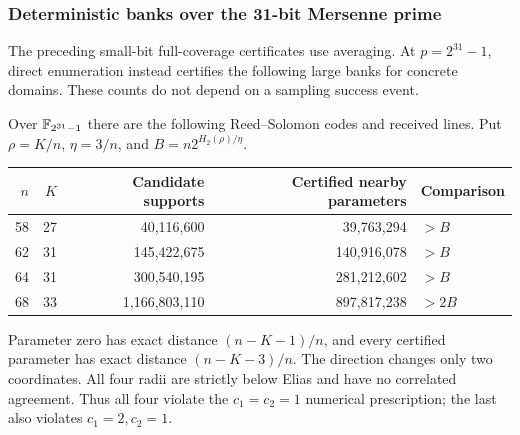\subsubsection{Deterministic banks over the 31-bit Mersenne prime}
\label{sec:paired-m31}

The preceding small-bit full-coverage certificates use averaging. At
$p=2^{31}-1$, direct enumeration instead certifies the following large
banks for concrete domains. These counts do not depend on a sampling
success event.

\begin{proposition}
\label{pd:m31-exact}
Over $\mathbb F_{2^{31}-1}$ there are the following Reed--Solomon codes and
received lines. Put $\rho=K/n$, $\eta=3/n$, and
$B=n2^{H_2(\rho)/\eta}$.
\begin{center}
\begin{tabular}{@{}rrrrl@{}}
\toprule
$n$ & $K$ & Candidate supports & Certified nearby parameters & Comparison\\
\midrule
58&27&40,116,600&39,763,294&$>B$\\
62&31&145,422,675&140,916,078&$>B$\\
64&31&300,540,195&281,212,602&$>B$\\
68&33&1,166,803,110&897,817,238&$>2B$\\
\bottomrule
\end{tabular}
\end{center}
Parameter zero has exact distance $(n-K-1)/n$, and every certified
parameter has exact distance $(n-K-3)/n$. The direction changes only
two coordinates. All four radii are strictly below Elias and have no
correlated agreement. Thus all four violate the $c_1=c_2=1$ numerical
prescription; the last also violates $c_1=2,c_2=1$.
\end{proposition}
